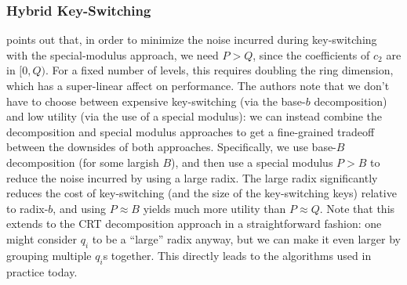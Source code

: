 \documentclass[../keyswitching.tex]{subfiles}
\begin{document}
\subsubsection{Hybrid Key-Switching}
\cite{cryptoeprint:2012/099} points out that, in order to minimize the noise incurred during key-switching with the special-modulus approach, we need $P > Q$, since the coefficients of $c_2$ are in $[0,Q)$. For a fixed number of levels, this requires doubling the ring dimension, which has a super-linear affect on performance. The authors note that we don't have to choose between expensive key-switching (via the base-$b$ decomposition) and low utility (via the use of a special modulus): we can instead combine the decomposition and special modulus approaches to get a fine-grained tradeoff between the downsides of both approaches. Specifically, we use base-$B$ decomposition (for some largish $B$), and then use a special modulus $P > B$ to reduce the noise incurred by using a large radix. The large radix significantly reduces the cost of key-switching (and the size of the key-switching keys) relative to radix-$b$, and using $P\approx B$ yields much more utility than $P\approx Q$. Note that this extends to the CRT decomposition approach in a straightforward fashion: one might consider $q_i$ to be a ``large'' radix anyway, but we can make it even larger by grouping multiple $q_i$s together. This directly leads to the algorithms used in practice today.

\ifcompileasbook
\else
\printbibliography
\fi
\end{document}
